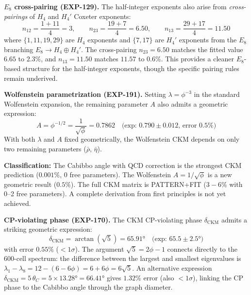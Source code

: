 \documentclass[12pt,a4paper]{article}
\begin{document}
\textbf{$E_8$ cross-pairing (EXP-129).} The half-integer exponents also arise from \emph{cross-pairings} of $H_4$ and $H_4'$ Coxeter exponents:
\begin{equation}
n_{12} = \frac{1+11}{4} = 3, \qquad n_{23} = \frac{19+7}{4} = 6.50, \qquad n_{13} = \frac{29+17}{4} = 11.50
\end{equation}
where $\{1,11,19,29\}$ are $H_4$ exponents and $\{7,17\}$ are $H_4'$ exponents from the $E_8$ branching $E_8 \to H_4 \oplus H_4'$. The cross-pairing $n_{23} = 6.50$ matches the fitted value $6.65$ to $2.3\%$, and $n_{13} = 11.50$ matches $11.57$ to $0.6\%$. This provides a cleaner $E_8$-based structure for the half-integer exponents, though the specific pairing rules remain underived.

\textbf{Wolfenstein parametrization (EXP-191).} Setting $\lambda = \phi^{-3}$ in the standard Wolfenstein expansion, the remaining parameter $A$ also admits a geometric expression:
\begin{equation}
A = \phi^{-1/2} = \frac{1}{\sqrt{\phi}} = 0.7862 \quad \text{(exp: } 0.790 \pm 0.012\text{, error 0.5\%)}
\label{eq:wolfenstein_A}
\end{equation}
With both $\lambda$ and $A$ fixed geometrically, the Wolfenstein CKM depends on only two remaining parameters ($\bar{\rho}$, $\bar{\eta}$).

\textbf{Classification:} The Cabibbo angle with QCD correction is the strongest CKM prediction ($0.001\%$, 0 free parameters). The Wolfenstein $A = 1/\sqrt{\phi}$ is a new geometric result ($0.5\%$). The full CKM matrix is PATTERN+FIT ($3{-}6\%$ with 0--2 free parameters). A complete derivation from first principles is not yet achieved.

\textbf{CP-violating phase (EXP-170).} The CKM CP-violating phase $\delta_{\text{CKM}}$ admits a striking geometric expression:
\begin{equation}
\delta_{\text{CKM}} = \arctan\!\left(\sqrt{5}\right) = 65.91° \quad \text{(exp: } 65.5 \pm 2.5°\text{)}
\end{equation}
with error $0.55\%$ ($< 1\sigma$). The argument $\sqrt{5} = 2\phi - 1$ connects directly to the 600-cell spectrum: the difference between the largest and smallest eigenvalues is $\lambda_1 - \lambda_8 = 12 - (6 - 6\phi) = 6 + 6\phi = 6\sqrt{5}$. An alternative expression $\delta_{\text{CKM}} = 5\,\theta_C = 5 \times 13.28° = 66.41°$ gives $1.32\%$ error (also $< 1\sigma$), linking the CP phase to the Cabibbo angle through the graph diameter.
\end{document}
